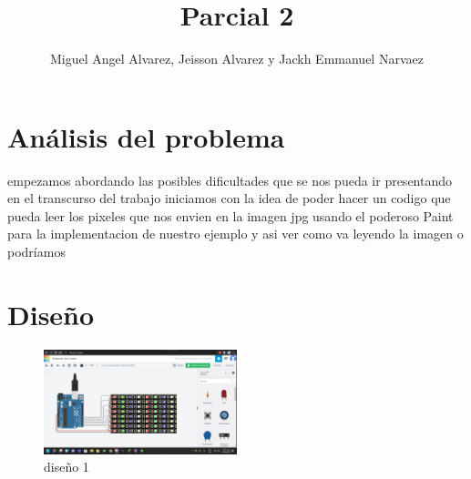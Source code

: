\documentclass{article}
\title{Parcial 2}
\author{Miguel Angel Alvarez, Jeisson Alvarez y Jackh Emmanuel Narvaez}
\begin{document}
\maketitle



\section{Análisis del problema}

empezamos abordando las posibles dificultades que se nos pueda ir presentando en el transcurso del trabajo iniciamos con la idea de poder hacer un codigo que pueda leer los pixeles que nos envien en la imagen jpg usando el poderoso Paint para la implementacion de nuestro ejemplo y asi ver como va leyendo la imagen o podríamos  


\section{Diseño}

\begin{figure}
\centering
\includegraphics[width=0.5\textwidth]{image1.png}
\caption{diseño 1}
\end{figure}
\end{document}
